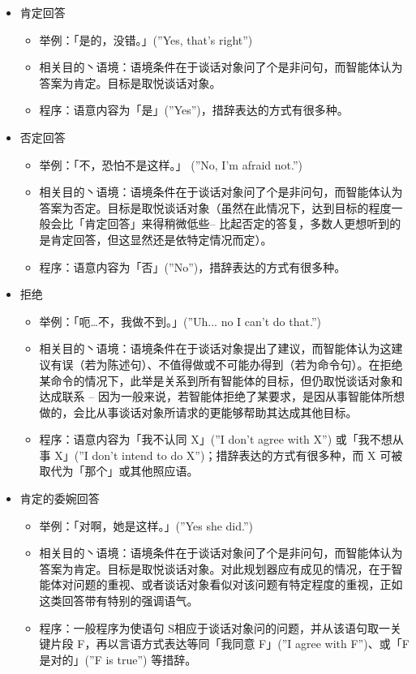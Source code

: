 \begin{itemize}


\item 肯定回答
\begin{itemize}
\item 举例：「是的，没错。」(”Yes, that’s right”)
\item 相关目的丶语境：语境条件在于谈话对象问了个是非问句，而智能体认为答案为肯定。目标是取悦谈话对象。
\item 程序：语意内容为「是」(”Yes”)，措辞表达的方式有很多种。
\end{itemize}


\item 否定回答
\begin{itemize}
\item 举例：「不，恐怕不是这样。」 (”No, I’m afraid not.”)
\item 相关目的丶语境：语境条件在于谈话对象问了个是非问句，而智能体认为答案为否定。目标是取悦谈话对象（虽然在此情况下，达到目标的程度一般会比「肯定回答」来得稍微低些– 比起否定的答复，多数人更想听到的是肯定回答，但这显然还是依特定情况而定）。 
\item 程序：语意内容为「否」(”No”)，措辞表达的方式有很多种。
\end{itemize}


\item 拒绝
\begin{itemize}
\item 举例：「呃…不，我做不到。」(”Uh... no I can’t do that.”)
\item 相关目的丶语境：语境条件在于谈话对象提出了建议，而智能体认为这建议有误（若为陈述句）、不值得做或不可能办得到（若为命令句）。在拒绝某命令的情况下，此举是关系到所有智能体的目标，但仍取悦谈话对象和达成联系 – 因为一般来说，若智能体拒绝了某要求，是因从事智能体所想做的，会比从事谈话对象所请求的更能够帮助其达成其他目标。
\item 程序：语意内容为「我不认同 X」(”I don’t agree with X”) 或「我不想从事 X」(”I don’t intend to do X”)；措辞表达的方式有很多种，而 X 可被取代为「那个」或其他照应语。
\end{itemize}


\item 肯定的委婉回答
\begin{itemize}
\item 举例：「对啊，她是这样。」(”Yes she did.”)
\item 相关目的丶语境：语境条件在于谈话对象问了个是非问句，而智能体认为答案为肯定。目标是取悦谈话对象。对此规划器应有成见的情况，在于智能体对问题的重视、或者谈话对象看似对该问题有特定程度的重视，正如这类回答带有特别的强调语气。 
\item 程序：一般程序为使语句 S相应于谈话对象问的问题，并从该语句取一关键片段 F，再以言语方式表达等同「我同意 F」(”I agree with F”)、或「F 是对的」(”F is true”) 等措辞。
\end{itemize}



\end{itemize}

